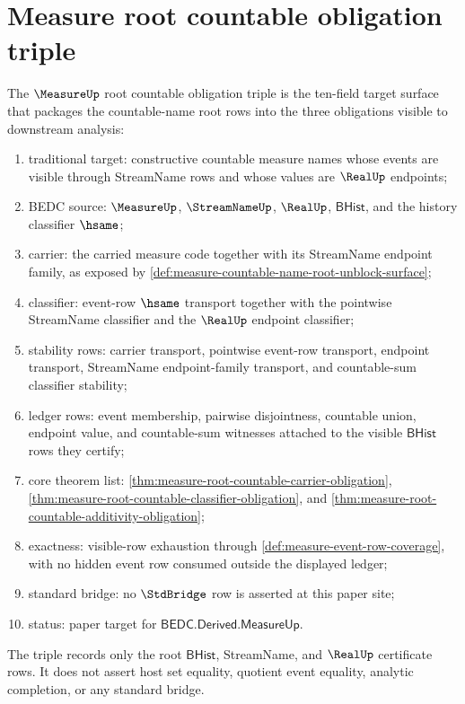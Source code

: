 \section{Measure root countable obligation triple}
\label{sec:measure-root-countable-obligation-triple}

\begin{definition}
\label{def:measure-root-countable-obligation-triple}
The $\MeasureUp$ root countable obligation triple is the ten-field target
surface that packages the countable-name root rows into the three obligations
visible to downstream analysis:
\begin{enumerate}
  \item traditional target: constructive countable measure names whose events
  are visible through StreamName rows and whose values are $\RealUp$
  endpoints;
  \item BEDC source: $\MeasureUp$, $\StreamNameUp$, $\RealUp$,
  $\mathsf{BHist}$, and the history classifier $\hsame$;
  \item carrier: the carried measure code together with its StreamName
  endpoint family, as exposed by
  \autoref{def:measure-countable-name-root-unblock-surface};
  \item classifier: event-row $\hsame$ transport together with the pointwise
  StreamName classifier and the $\RealUp$ endpoint classifier;
  \item stability rows: carrier transport, pointwise event-row transport,
  endpoint transport, StreamName endpoint-family transport, and countable-sum
  classifier stability;
  \item ledger rows: event membership, pairwise disjointness, countable
  union, endpoint value, and countable-sum witnesses attached to the visible
  $\mathsf{BHist}$ rows they certify;
  \item core theorem list:
  \autoref{thm:measure-root-countable-carrier-obligation},
  \autoref{thm:measure-root-countable-classifier-obligation}, and
  \autoref{thm:measure-root-countable-additivity-obligation};
  \item exactness: visible-row exhaustion through
  \autoref{def:measure-event-row-coverage}, with no hidden event row consumed
  outside the displayed ledger;
  \item standard bridge: no $\StdBridge$ row is asserted at this paper site;
  \item status: paper target for $\mathsf{BEDC.Derived.MeasureUp}$.
\end{enumerate}
The triple records only the root $\mathsf{BHist}$, StreamName, and $\RealUp$
certificate rows. It does not assert host set equality, quotient event
equality, analytic completion, or any standard bridge.
\end{definition}

